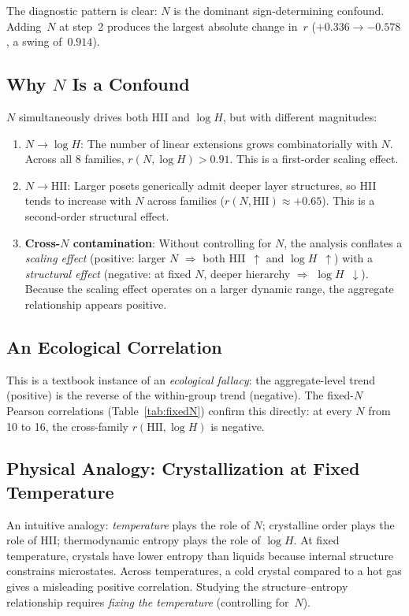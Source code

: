 \documentclass[entropy,article,submit,pdftex,moreauthors]{Definitions/mdpi}
\begin{document}
The diagnostic pattern is clear: $N$ is the dominant sign-determining confound. Adding~$N$ at step~2 produces the largest absolute change in~$r$ ($+0.336 \to -0.578$, a swing of~$0.914$).

\subsection{Why $N$ Is a Confound}

$N$ simultaneously drives both HII and $\log H$, but with different magnitudes:

\begin{enumerate}[nosep]
    \item \textbf{$N \to \log H$}: The number of linear extensions grows combinatorially with $N$. Across all 8 families, $r(N, \log H) > 0.91$. This is a first-order scaling effect.
    \item \textbf{$N \to \text{HII}$}: Larger posets generically admit deeper layer structures, so HII tends to increase with $N$ across families ($r(N, \text{HII}) \approx +0.65$). This is a second-order structural effect.
    \item \textbf{Cross-$N$ contamination}: Without controlling for $N$, the analysis conflates a \emph{scaling effect} (positive: larger $N$ $\Rightarrow$ both HII~$\uparrow$ and $\log H$~$\uparrow$) with a \emph{structural effect} (negative: at fixed $N$, deeper hierarchy $\Rightarrow$ $\log H$~$\downarrow$). Because the scaling effect operates on a larger dynamic range, the aggregate relationship appears positive.
\end{enumerate}

\subsection{An Ecological Correlation}

This is a textbook instance of an \emph{ecological fallacy}: the aggregate-level trend (positive) is the reverse of the within-group trend (negative). The fixed-$N$ Pearson correlations (Table~\ref{tab:fixedN}) confirm this directly: at every $N$ from 10 to 16, the cross-family $r(\text{HII}, \log H)$ is negative.

\subsection{Physical Analogy: Crystallization at Fixed Temperature}

An intuitive analogy: \emph{temperature} plays the role of $N$; crystalline order plays the role of HII; thermodynamic entropy plays the role of $\log H$. At fixed temperature, crystals have lower entropy than liquids because internal structure constrains microstates. Across temperatures, a cold crystal compared to a hot gas gives a misleading positive correlation. Studying the structure--entropy relationship requires \emph{fixing the temperature} (controlling for~$N$).
\end{document}
